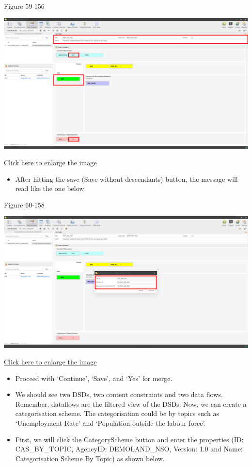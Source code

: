 \documentclass[
]{book}
\providecommand{\tightlist}{%
  \setlength{\itemsep}{0pt}\setlength{\parskip}{0pt}}
\theoremstyle{definition}
\theoremstyle{definition}
\theoremstyle{definition}
\theoremstyle{definition}
\theoremstyle{remark}
\begin{document}
Figure 59-156

\begin{center}\includegraphics[width=1\linewidth]{./images/image156} \end{center}

\href{images/image156.png}{Click here to enlarge the image}

\begin{itemize}
\tightlist
\item
  After hitting the save (Save without descendants) button, the message will read like the one below.
\end{itemize}

Figure 60-158

\begin{center}\includegraphics[width=1\linewidth]{./images/image158} \end{center}

\href{images/image158.png}{Click here to enlarge the image}

\begin{itemize}
\tightlist
\item
  Proceed with `Continue', `Save', and `Yes' for merge.
\item
  We should see two DSDs, two content constraints and two data flows. Remember, dataflows are the filtered view of the DSDs.
  Now, we can create a categorisation scheme. The categorisation could be by topics such as `Unemployment Rate' and `Population outside the labour force'.
\item
  First, we will click the CategoryScheme button and enter the properties (ID: CAS\_BY\_TOPIC, AgencyID: DEMOLAND\_NSO, Version: 1.0 and Name: Categorisation Scheme By Topic) as shown below.
\end{itemize}
\end{document}
